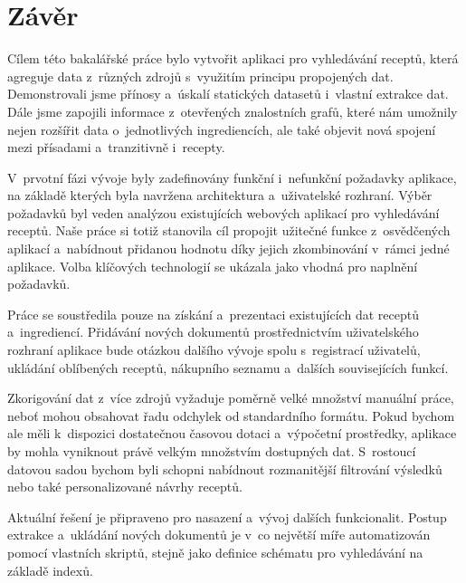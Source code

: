 \chapter*{Závěr}

Cílem této bakalářské práce bylo vytvořit aplikaci pro vyhledávání receptů, která agreguje data z~různých zdrojů s~využitím principu propojených dat. Demonstrovali jsme přínosy a~úskalí statických datasetů i~vlastní extrakce dat. Dále jsme zapojili informace z~otevřených znalostních grafů, které nám umožnily nejen rozšířit data o~jednotlivých ingrediencích, ale také objevit nová spojení mezi přísadami a~tranzitivně i~recepty.

V~prvotní fázi vývoje byly zadefinovány funkční i~nefunkční požadavky aplikace, na základě kterých byla navržena architektura a~uživatelské rozhraní. Výběr požadavků byl veden analýzou existujících webových aplikací pro vyhledávání receptů. Naše práce si totiž stanovila cíl propojit užitečné funkce z~osvědčených aplikací a~nabídnout přidanou hodnotu díky jejich zkombinování v~rámci jedné aplikace. Volba klíčových technologií se ukázala jako vhodná pro naplnění požadavků.

Práce se soustředila pouze na získání a~prezentaci existujících dat receptů a~ingrediencí. Přidávání nových dokumentů prostřednictvím uživatelského rozhraní aplikace bude otázkou dalšího vývoje spolu s~registrací uživatelů, ukládání oblíbených receptů, nákupního seznamu a~dalších souvisejících funkcí.

Zkorigování dat z~více zdrojů vyžaduje poměrně velké množství manuální práce, neboť mohou obsahovat řadu odchylek od standardního formátu. Pokud bychom ale měli k~dispozici dostatečnou časovou dotaci a~výpočetní prostředky, aplikace by mohla vyniknout právě velkým množstvím dostupných dat. S~rostoucí datovou sadou bychom byli schopni nabídnout rozmanitější filtrování výsledků nebo také personalizované návrhy receptů.

Aktuální řešení je připraveno pro nasazení a~vývoj dalších funkcionalit. Postup extrakce a~ukládání nových dokumentů je v~co největší míře automatizován pomocí vlastních skriptů, stejně jako definice schématu pro vyhledávání na základě indexů.